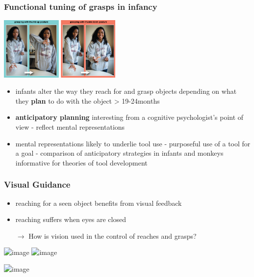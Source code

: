 \documentclass[]{beamer}
\begin{document}
\begin{frame}
 \frametitle{Functional tuning of grasps in infancy}
\begin{overlayarea}{120mm}{80mm}

\begin{center}
\includegraphics[width=60mm]{figs/l9/grasp_planning.png}
\end{center}
\begin{itemize}
 \item<2-> infants alter the way they reach for and grasp objects depending on what they \textbf{plan} to do with the object > 19-24months
 \item<3-> \textbf{anticipatory planning} interesting from a cognitive psychologist's point of view - reflect mental representations
 \item<4-> mental representations likely to underlie tool use - purposeful use of a tool for a goal - comparison of anticipatory strategies in infants and monkeys informative for theories of tool development
\end{itemize}
\end{overlayarea}
\end{frame}

\begin{frame}
 \frametitle{Visual Guidance}
\begin{overlayarea}{120mm}{90mm}
\begin{itemize}
 \item reaching for a seen object benefits from visual feedback
 \item reaching suffers when eyes are closed
 \item[$\rightarrow$] How is vision used in the control of reaches and grasps?
\end{itemize}

\begin{center}
\includegraphics<1>[width=50mm]{figs/l9/visual_guidance.png}
\includegraphics<2->[width=90mm]{figs/l9/soma_setup.png}

\includegraphics<3>[width=50mm]{figs/l9/rbo_traces_blurred.png}
\end{center}
\end{overlayarea}
\end{frame}
\end{document}
